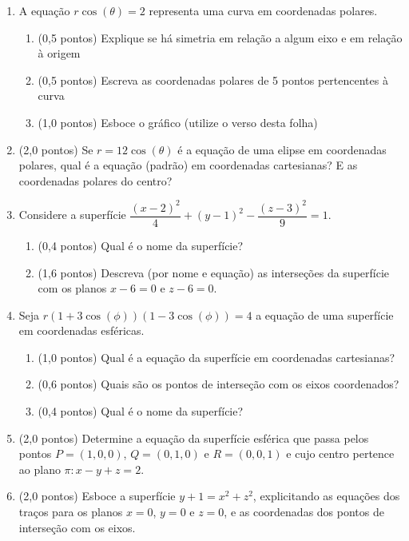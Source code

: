 \documentclass[12pt,a4paper]{article}
\begin{document}
\begin{enumerate}
\item A equação $r\cos(\theta) = 2$ representa uma curva em coordenadas polares.
\begin{enumerate}
\item (0,5 pontos) Explique se há simetria em relação a algum eixo e em relação à origem
\item (0,5 pontos) Escreva as coordenadas polares de 5 pontos pertencentes à curva
\item (1,0 pontos) Esboce o gráfico (utilize o verso desta folha)
\end{enumerate}

\item (2,0 pontos) Se $r = 12 \cos(\theta)$ é a equação de uma elipse em coordenadas polares, qual é a equação (padrão) em coordenadas cartesianas? E as coordenadas polares do centro?

\item Considere a superfície $\dfrac{(x-2)^2}{4} + (y-1)^2 - \dfrac{(z-3)^2}{9} = 1$.
\begin{enumerate}
\item (0,4 pontos) Qual é o nome da superfície?
\item (1,6 pontos) Descreva (por nome e equação) as interseções da superfície com os planos $x - 6 = 0$ e $z - 6 = 0$.
\end{enumerate}

\item Seja $r(1 + 3 \cos(\phi))(1 - 3\cos(\phi)) = 4$ a equação de uma superfície em coordenadas esféricas.
\begin{enumerate}
\item (1,0 pontos) Qual é a equação da superfície em coordenadas cartesianas?
\item (0,6 pontos) Quais são os pontos de interseção com os eixos coordenados?
\item (0,4 pontos) Qual é o nome da superfície?
\end{enumerate}

\item (2,0 pontos) Determine a equação da superfície esférica que passa pelos pontos $P=(1,0,0)$, $Q=(0,1,0)$ e $R=(0,0,1)$ e cujo centro pertence ao plano $\pi: x-y+z=2$.

\item (2,0 pontos) Esboce a superfície $y + 1 = x^2 + z^2$, explicitando as equações dos traços para os planos $x = 0$, $y=0$ e $z=0$, e as coordenadas dos pontos de interseção com os eixos.
\end{enumerate}
\end{document}

